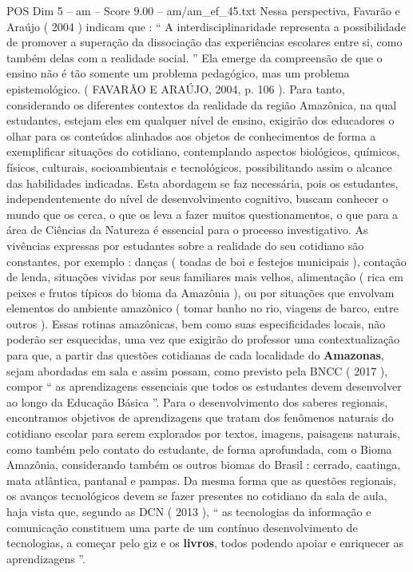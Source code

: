 \begin{textsample}{POS Dim 5 – am – Score 9.00 – am/am\_ef\_45.txt}
Nessa perspectiva, Favarão e Araújo ( 2004 ) indicam que : “ A interdisciplinaridade representa a possibilidade de promover a superação da dissociação das experiências escolares entre si, como também delas com a realidade social. ” Ela emerge da compreensão de que o ensino não é tão somente um problema pedagógico, mas um problema epistemológico. ( FAVARÃO E ARAÚJO, 2004, p. 106 ).
Para tanto, considerando os diferentes contextos da realidade da região Amazônica, na qual estudantes, estejam eles em qualquer nível de ensino, exigirão dos educadores o olhar para os conteúdos alinhados aos objetos de conhecimentos de forma a exemplificar situações do cotidiano, contemplando aspectos biológicos, químicos, físicos, culturais, socioambientais e tecnológicos, possibilitando assim o alcance das habilidades indicadas.
Esta abordagem se faz necessária, pois os estudantes, independentemente do nível de desenvolvimento cognitivo, buscam conhecer o mundo que os cerca, o que os leva a fazer muitos questionamentos, o que para a área de Ciências da Natureza é essencial para o processo investigativo.
As vivências expressas por estudantes sobre a realidade do seu cotidiano são constantes, por exemplo : danças ( toadas de boi e festejos municipais ), contação de lenda, situações vividas por seus familiares mais velhos, alimentação ( rica em peixes e frutos típicos do bioma da Amazônia ), ou por situações que envolvam elementos do ambiente amazônico ( tomar banho no rio, viagens de barco, entre outros ).
Essas rotinas amazônicas, bem como suas especificidades locais, não poderão ser esquecidas, uma vez que exigirão do professor uma contextualização para que, a partir das questões cotidianas de cada localidade do \textbf{Amazonas}, sejam abordadas em sala e assim possam, como previsto pela BNCC ( 2017 ), compor “ as aprendizagens essenciais que todos os estudantes devem desenvolver ao longo da Educação Básica ”.
Para o desenvolvimento dos saberes regionais, encontramos objetivos de aprendizagens que tratam dos fenômenos naturais do cotidiano escolar para serem explorados por textos, imagens, paisagens naturais, como também pelo contato do estudante, de forma aprofundada, com o Bioma Amazônia, considerando também os outros biomas do Brasil : cerrado, caatinga, mata atlântica, pantanal e pampas.
Da mesma forma que as questões regionais, os avanços tecnológicos devem se fazer presentes no cotidiano da sala de aula, haja vista que, segundo as DCN ( 2013 ), “ as tecnologias da informação e comunicação constituem uma parte de um contínuo desenvolvimento de tecnologias, a começar pelo giz e os \textbf{livros}, todos podendo apoiar e enriquecer as aprendizagens ”.

\end{textsample}
